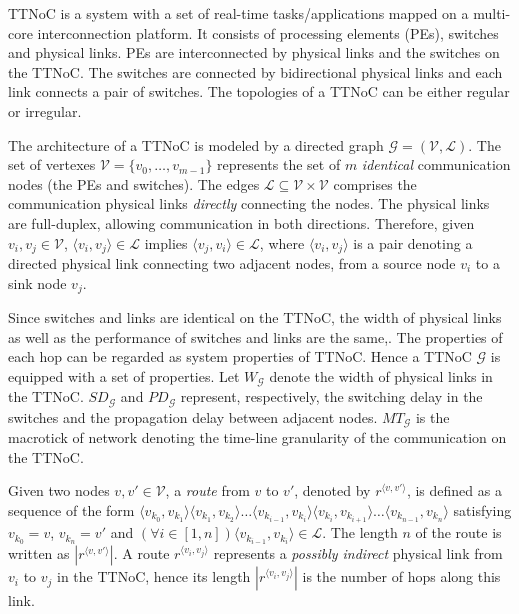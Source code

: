\documentclass[journal]{IEEEtran}
\newcommand{\calG}{\mathcal{G}}
\newcommand{\calV}{\mathcal{V}}
\newcommand{\calL}{\mathcal{L}}
\newcommand{\width}{\mathit{W}_\calG}
\newcommand{\SD}{\mathit{SD}_\calG}
\newcommand{\HD}{\mathit{PD}_\calG}
\newcommand{\MT}{\mathit{MT}_\calG}
\newcommand{\route}[3]{#1^{\langle #2,#3\rangle}}
\theoremstyle{remark}
\begin{document}
TTNoC is a system with a set of real-time tasks/applications mapped on a multi-core interconnection platform. 
It consists of processing elements (PEs), switches and physical links.
PEs are interconnected by physical links and the switches on the TTNoC.
The switches are connected by bidirectional physical links and each link connects a pair of switches.  
The topologies of a TTNoC can be either regular or irregular.

The architecture of a TTNoC is modeled by a directed graph $\calG=(\calV,\calL)$. 
The set of vertexes $\mathcal{V}=\{ v_{0},\dots,v_{m-1}\}$ represents the set of $m$ \emph{identical} communication nodes (the PEs and switches).
The edges $\mathcal{L}\subseteq \mathcal{V} \times\mathcal{V}$ comprises the communication physical links \emph{directly} connecting the nodes.
The physical links are full-duplex, allowing communication in both directions. 
Therefore, given $v_i,v_j\in\calV$, $\langle v_i,v_j\rangle \in\calL$ implies $\langle v_j,v_i\rangle\in\calL$,
 where $\langle v_i,v_j\rangle$ is a pair denoting a directed physical link connecting two adjacent nodes,
  from a source node $v_i$ to a sink node $v_j$.

Since switches and links are identical on the TTNoC,
 the width of physical links as well as the performance of switches and links are the same,.
The properties of each hop can be regarded as system properties of TTNoC.
Hence a TTNoC $\calG$ is equipped with a set of properties. 
Let $\width$ denote the width of physical links in the TTNoC.
$\SD$ and $\HD$ represent, respectively, the switching delay in the switches and the propagation delay between adjacent nodes.
$\MT$ is the macrotick of network denoting the time-line granularity of the communication on the TTNoC.


Given two nodes $v,v'\in\calV$, a \emph{route} from $v$ to $v'$,
 denoted by $\route{r}{v}{v'}$, is defined as a sequence of the form 
 $\langle v_{k_0},v_{k_1}\rangle\langle
v_{k_1},v_{k_2}\rangle\ldots\langle v_{k_{i-1}},v_{k_i}\rangle\langle
v_{k_i},v_{k_{i+1}}\rangle\ldots \langle v_{k_{n-1}},v_{k_n}\rangle$
satisfying $v_{k_0}=v$, $v_{k_n}=v'$ and $(\forall i\in [1,n])\langle
v_{k_{i-1}},v_{k_i}\rangle \in\calL$. The length $n$ of the route is
written as $|\route{r}{v}{v'}|$. A route $\route{r}{v_i}{v_j}$
represents a \emph{possibly indirect} physical link from $v_i$ to
$v_j$ in the TTNoC, hence its length $|\route{r}{v_i}{v_j}|$ is the
number of hops along this link.
\end{document}
